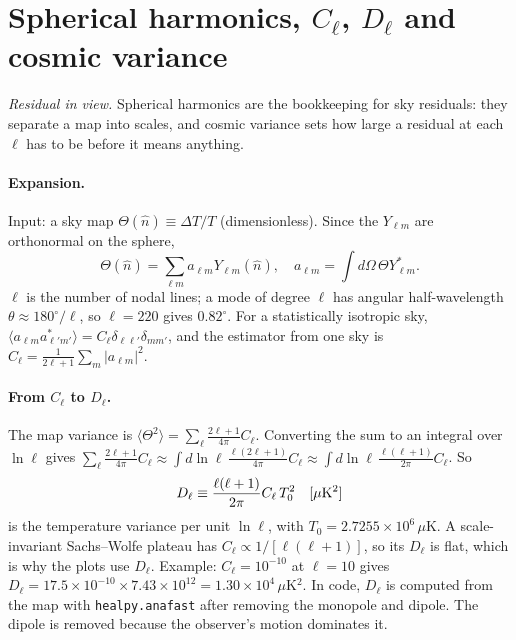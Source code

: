 \documentclass[10pt,twocolumn]{article}
\begin{document}
\section{Spherical harmonics, $C_\ell$, $D_\ell$ and cosmic variance}\label{sec:harm}
\noindent\emph{Residual in view.} Spherical harmonics are the bookkeeping for sky residuals: they separate a map into scales, and cosmic variance sets how large a residual at each $\ell$ has to be before it means anything.

\paragraph{Expansion.} Input: a sky map $\Theta(\hat n)\equiv\Delta T/T$ (dimensionless). Since the $Y_{\ell m}$ are orthonormal on the sphere,
\begin{equation}
\Theta(\hat n)=\sum_{\ell m}a_{\ell m}Y_{\ell m}(\hat n),\quad a_{\ell m}=\!\int\!d\Omega\,\Theta Y^*_{\ell m}.
\end{equation}
$\ell$ is the number of nodal lines; a mode of degree $\ell$ has angular half-wavelength $\theta\approx180^\circ/\ell$, so $\ell=220$ gives $0.82^\circ$. For a statistically isotropic sky, $\langle a_{\ell m}a^*_{\ell'm'}\rangle=C_\ell\delta_{\ell\ell'}\delta_{mm'}$, and the estimator from one sky is $\hat C_\ell=\frac{1}{2\ell+1}\sum_m|a_{\ell m}|^2$.

\paragraph{From $C_\ell$ to $D_\ell$.} The map variance is $\langle\Theta^2\rangle=\sum_\ell\frac{2\ell+1}{4\pi}C_\ell$. Converting the sum to an integral over $\ln\ell$ gives $\sum_\ell\frac{2\ell+1}{4\pi}C_\ell\approx\int d\ln\ell\,\frac{\ell(2\ell+1)}{4\pi}C_\ell\approx\int d\ln\ell\,\frac{\ell(\ell+1)}{2\pi}C_\ell$. So
\begin{equation}
D_\ell\equiv\frac{\ell(\ell+1)}{2\pi}C_\ell\,T_0^2\quad[\mu{\rm K}^2]
\end{equation}
is the temperature variance per unit $\ln\ell$, with $T_0=2.7255\times10^6\,\mu$K. A scale-invariant Sachs--Wolfe plateau has $C_\ell\propto1/[\ell(\ell+1)]$, so its $D_\ell$ is flat, which is why the plots use $D_\ell$. Example: $C_\ell=10^{-10}$ at $\ell=10$ gives $D_\ell=17.5\times10^{-10}\times7.43\times10^{12}=1.30\times10^4\,\mu$K$^2$. In code, $D_\ell$ is computed from the map with \texttt{healpy.anafast} after removing the monopole and dipole. The dipole is removed because the observer's motion dominates it.
\end{document}
